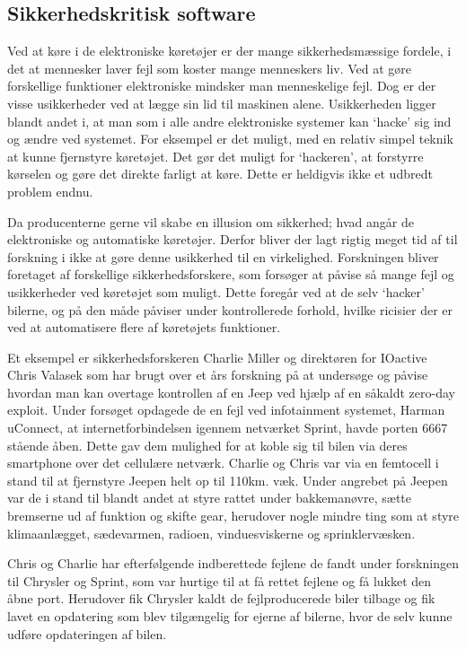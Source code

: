 \subsection{Sikkerhedskritisk software}
Ved at køre i de elektroniske køretøjer er der mange sikkerhedsmæssige fordele, i det at mennesker laver fejl som koster mange menneskers liv. Ved at gøre forskellige funktioner elektroniske mindsker man menneskelige fejl. Dog er der visse usikkerheder ved at lægge sin lid til maskinen alene. Usikkerheden ligger blandt andet i, at man som i alle andre elektroniske systemer kan `hacke' sig ind og ændre ved systemet. For eksempel er det muligt, med en relativ simpel teknik at kunne fjernstyre køretøjet. Det gør det muligt for `hackeren', at forstyrre kørselen og gøre det direkte farligt at køre. Dette er heldigvis ikke et udbredt problem endnu.  

Da producenterne gerne vil skabe en illusion om sikkerhed; hvad angår de elektroniske og automatiske køretøjer. Derfor bliver der lagt rigtig meget tid af til forskning i ikke at gøre denne usikkerhed til en virkelighed. Forskningen bliver foretaget af forskellige sikkerhedsforskere, som forsøger at påvise så mange fejl og usikkerheder ved køretøjet som muligt. Dette foregår ved at de selv `hacker' bilerne, og på den måde påviser under kontrollerede forhold, hvilke ricisier der er ved at automatisere flere af køretøjets funktioner.  


Et eksempel er sikkerhedsforskeren Charlie Miller og direktøren for IOactive Chris Valasek som har brugt over et års forskning på at undersøge og påvise hvordan man kan overtage kontrollen af en Jeep ved hjælp af en såkaldt zero-day exploit. Under forsøget opdagede de en fejl ved infotainment systemet, Harman uConnect, at internetforbindelsen igennem netværket Sprint, havde porten 6667 stående åben. Dette gav dem mulighed for at koble sig til bilen via deres smartphone over det cellulære netværk. Charlie og Chris var via en femtocell i stand til at fjernstyre Jeepen helt op til 110km. væk. Under angrebet på Jeepen var de i stand til blandt andet at styre rattet under bakkemanøvre, sætte bremserne ud af funktion og skifte gear, herudover nogle mindre ting som at styre klimaanlægget, sædevarmen, radioen, vinduesviskerne og sprinklervæsken.  

Chris og Charlie har efterfølgende indberettede fejlene de fandt under forskningen til Chrysler og Sprint, som var hurtige til at få rettet fejlene og få lukket den åbne port. Herudover fik Chrysler kaldt de fejlproducerede biler tilbage og fik lavet en opdatering som blev tilgængelig for ejerne af bilerne, hvor de selv kunne udføre opdateringen af bilen.   

